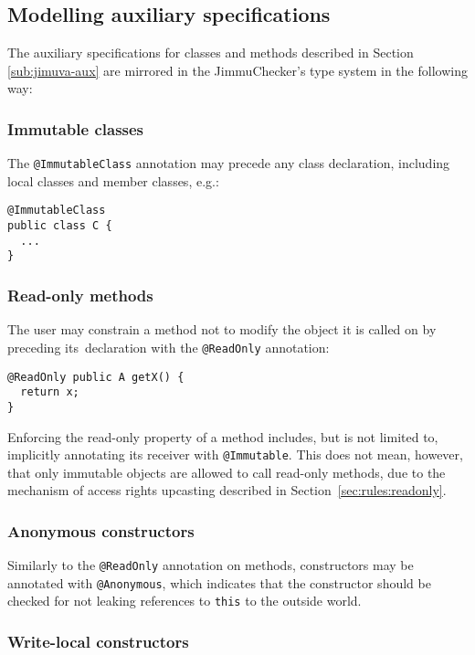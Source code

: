 \documentclass{pracamgr}
\theoremstyle{break}
\theoremstyle{break}
\theoremstyle{break}
\begin{document}
\subsection{Modelling auxiliary specifications}

The auxiliary specifications for classes and methods described in
Section \ref{sub:jimuva-aux} are mirrored in the JimmuChecker's type
system in the following way: 

\subsubsection{Immutable classes}

The \texttt{@ImmutableClass} annotation may precede any class
declaration, including local classes and member classes, e.g.:

\begin{lstlisting}
@ImmutableClass
public class C {
  ...
}
\end{lstlisting}

\subsubsection{Read-only methods}

The user may constrain a method not to modify the object it is called
on by preceding its~declaration with the \texttt{@ReadOnly} annotation:

\begin{lstlisting}
@ReadOnly public A getX() { 
  return x; 
}
\end{lstlisting}
Enforcing the read-only property of a method includes, but is not
limited to, implicitly annotating its receiver with
\texttt{@Immutable}. This does not mean, however, that only immutable
objects are allowed to call read-only methods, due to the mechanism of
access rights upcasting described in Section~\ref{sec:rules:readonly}.

\subsubsection{Anonymous constructors}

Similarly to the \texttt{@ReadOnly} annotation on methods,
constructors may be annotated with \texttt{@Anonymous}, which
indicates that the constructor should be checked for not leaking
references to \texttt{this} to the outside world.

\subsubsection{Write-local constructors}
\label{sub:mirroring-writelocal}
\end{document}
